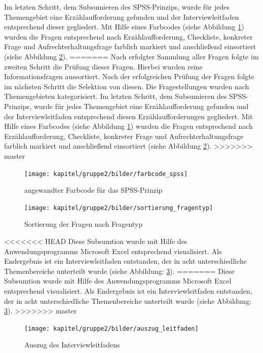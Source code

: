 Im letzten Schritt, dem Subsumieren des SPSS-Prinzips, wurde für jedes Themengebiet eine Erzählaufforderung gefunden und der Interviewleitfaden entsprechend dieser gegliedert. Mit Hilfe eines Farbcodes (siehe Abbildung \ref{fig_farbcode_SPSS}) wurden die Fragen entsprechend nach Erzählaufforderung, Checkliste, konkreter Frage und Aufrechterhaltungsfrage farblich markiert und anschließend einsortiert (siehe Abbildung \ref{fig_sortierung_fragentyp}).
=======
Nach erfolgter Sammlung aller Fragen folgte im zweiten Schritt die Prüfung dieser Fragen. Hierbei wurden reine Informationsfragen aussortiert. Nach der erfolgreichen Prüfung der Fragen folgte im nächsten Schritt die Selektion von diesen. Die Fragestellungen wurden nach Themengebieten kategorisiert. Im letzten Schritt, dem Subsumieren des SPSS-Prinzips, wurde für jedes Themengebiet eine Erzählaufforderung gefunden und der Interviewleitfaden entsprechend diesen Erzählaufforderungen gegliedert. Mit Hilfe eines Farbcodes (siehe Abbildung \ref{fig_farbcode_SPSS}) wurden die Fragen entsprechend nach Erzählaufforderung, Checkliste, konkreter Frage und Aufrechterhaltungsfrage farblich markiert und anschließend einsortiert (siehe Abbildung \ref{fig_sortierung_fragentyp}).
>>>>>>> master

\begin{figure}[h!]
	\centering
	\texttt{[image: kapitel/gruppe2/bilder/farbcode\_spss]}
	\caption{angewandter Farbcode für das SPSS-Prinzip}
	\label{fig_farbcode_SPSS}
\end{figure}

\begin{figure}[h!]
	\centering
	\texttt{[image: kapitel/gruppe2/bilder/sortierung\_fragentyp]}
	\caption{Sortierung der Fragen nach Fragentyp}
	\label{fig_sortierung_fragentyp}
\end{figure}

<<<<<<< HEAD
Diese Subsumtion wurde mit Hilfe des Anwendungsprogramms Microsoft Excel entsprechend visualisiert. Als Endergebnis ist ein Interviewleitfaden entstanden, der in acht unterschiedliche Themenbereiche unterteilt wurde  (siehe Abbildung: \ref{fig_auszug_interviewleitfaden}).
=======
Diese Subsumtion wurde mit Hilfe des Anwendungsprogramms Microsoft Excel entsprechend visualisiert. Als Endergebnis  ist ein Interviewleitfaden entstanden, der in acht unterschiedliche Themenbereiche unterteilt wurde  (siehe Abbildung: \ref{fig_auszug_interviewleitfaden}).
>>>>>>> master

\begin{figure}[h!]
	\centering
	\texttt{[image: kapitel/gruppe2/bilder/auszug\_leitfaden]}
	\caption{Auszug des Interviewleitfadens}
	\label{fig_auszug_interviewleitfaden}
\end{figure}

